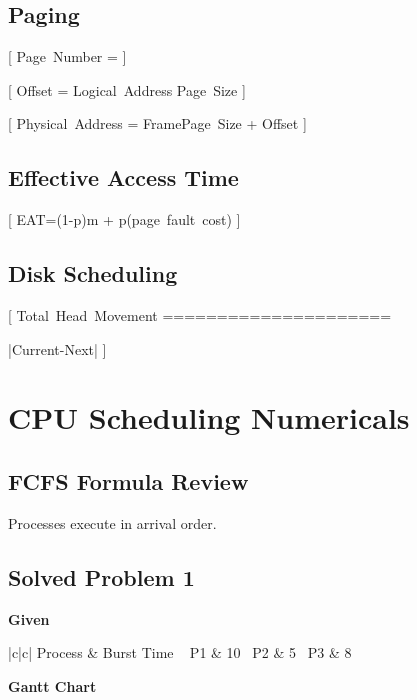 \subsection{Paging}

[
Page\ Number =
\left\lfloor
{}
\right\rfloor
]

[
Offset =
Logical\ Address \bmod Page\ Size
]

[
Physical\ Address =
Frame\times Page\ Size + Offset
]

\subsection{Effective Access Time}

[
EAT=(1-p)\times m + p\times(page\ fault\ cost)
]

\subsection{Disk Scheduling}

[
Total\ Head\ Movement
=====================

\sum |Current-Next|
]

\newpage

\section{CPU Scheduling Numericals}

\subsection{FCFS Formula Review}

Processes execute in arrival order.

\subsection{Solved Problem 1}

\textbf{Given}

\begin{center}
\begin{tabular}{|c|c|}
\hline
Process & Burst Time \
\hline
P1 & 10 \
P2 & 5 \
P3 & 8 \
\hline
\end{tabular}
\end{center}

\textbf{Gantt Chart}

